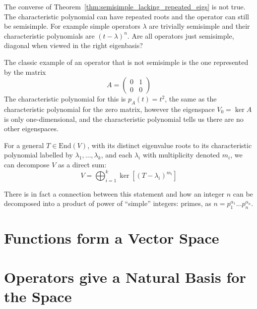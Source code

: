 	The converse of Theorem~\ref{thm:semisimple_lacking_repeated_eigs} is not true. The characteristic polynomial can have repeated roots and the operator can still be semisimple. For example simple operators $\lambda$ are trivially semisimple and their characteristic polynomials are $(t-\lambda)^n$. Are all operators just semisimple, diagonal when viewed in the right eigenbasis?
	
	The classic example of an operator that is not semisimple is the one represented by the matrix
	\begin{equation*}
		A= \begin{pmatrix}
			 0 & 1 \\
			 0 & 0
		\end{pmatrix}
	\end{equation*}
	The characteristic polynomial for this is $p_A(t) = t^2$, the same as the characteristic polynomial for the zero matrix, however the eigenspace $V_0 = \ker A$ is only one-dimensional, and the characteristic polynomial tells us there are no other eigenspaces. 
	

	\begin{theorem}
		For a general $T \in \mathrm{End}(V)$, with its distinct eigenvalue roots to its characteristic polynomial labelled by $\lambda_1, \dots, \lambda_k$, and each $\lambda_i$ with multiplicity denoted $m_i$, we can decompose $V$ as a direct sum:
		\begin{equation}
			V = \bigoplus_{i=1}^k \ker \left[ (T - \lambda_i)^{m_i} \right]
		\end{equation}
	\end{theorem}
	There is in fact a connection between this statement and how an integer $n$ can be decomposed into a product of power of ``simple'' integers: primes, as $n = p_1 ^{\alpha_1} \dots p_n ^{\alpha_n}$.



\section{Functions form a Vector Space} %
\label{sec:functions_form_a_vector_space}


\section{Operators give a Natural Basis for the Space} %
\label{sec:operators_give_a_natural_basis_for_the_space}


